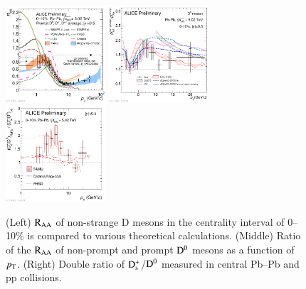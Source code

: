 \documentclass[3p,times,procedia]{elsarticle}
\newcommand{\pt}{p_{\rm T}}
\newcommand{\Dzero}{{\rm D^0}}
\newcommand{\Ds}{{\rm D_{s}^+}}
\newcommand{\RAA}{\rm R_{AA}}
\begin{document}
\begin{figure}[h]
\includegraphics[width=0.33\textwidth]{Plots/D/2019-10-31-2019-10-28-DmesonAverage_vs_transportmodels_010_5dot02.pdf}
\includegraphics[width=0.33\textwidth]{Plots/NP/2019-10-31-2019-10-29-D0PbPb5TeV_010_RaaRatio_wModel.pdf}
\includegraphics[width=0.33\textwidth]{Plots/D/2019-10-31-2019-10-28-DoubleRatio_DsOverDzero_PbPb2018_010_pp_WithModels.pdf}
\caption{(Left) $\RAA$ of non-strange D mesons in the centrality interval of 0--10$\%$ is compared to various theoretical calculations. 
	(Middle) Ratio of the $\RAA$ of non-prompt and prompt $\Dzero$ mesons as a function of $\pt$. 
	(Right) Double ratio of $\Ds$/$\Dzero$ measured in central Pb--Pb and pp collisions.}
\label{fig:prompt_nonpromptRAA}
\end{figure}
\end{document}
